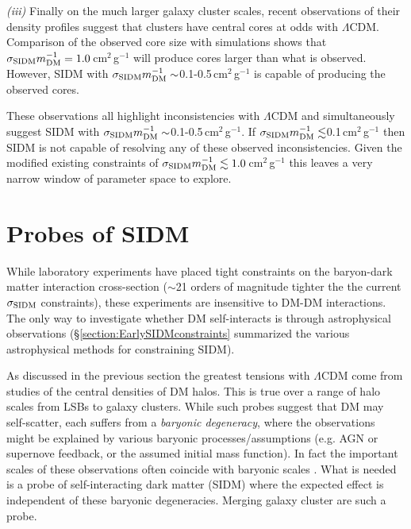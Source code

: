 {\it (iii)} Finally on the much larger galaxy cluster scales, recent observations of their density profiles \citep{Newman:2012wt, Newman:2012tk} suggest that clusters have central cores at odds with $\Lambda$CDM.
Comparison of the observed core size with simulations \citep{Peter:2012vi, Rocha:2012tr} shows that $\sigma_{\rm SIDM}m_{\rm DM}^{-1} = 1.0$\,cm$^2$\,g$^{-1}$ will produce cores larger than what is observed.
However, SIDM with $\sigma_{\rm SIDM}m_{\rm DM}^{-1} \sim$0.1-0.5\,cm$^2$\,g$^{-1}$ is capable of producing the observed cores.

These observations all highlight inconsistencies with $\Lambda$CDM and simultaneously suggest SIDM with $\sigma_{\rm SIDM}m_{\rm DM}^{-1}  \sim$0.1-0.5\,cm$^2$\,g$^{-1}$.
If $\sigma_{\rm SIDM}m_{\rm DM}^{-1}  \lesssim$0.1\,cm$^2$\,g$^{-1}$ then SIDM is not capable of resolving any of these observed inconsistencies.
Given the modified existing constraints of $\sigma_{\rm SIDM}m_{\rm DM}^{-1}\lesssim 1.0$\,cm$^2$\,g$^{-1}$ this leaves a very narrow window of parameter space to explore.

\section{Probes of SIDM}\label{section:SIDMprobes}

While laboratory experiments have placed tight constraints on the baryon-dark matter interaction cross-section ($\sim$21 orders of magnitude tighter the the current $\sigma_{\rm SIDM}$ constraints), these experiments are insensitive to DM-DM interactions.
The only way to investigate whether DM self-interacts is through astrophysical observations (\S\ref{section:EarlySIDMconstraints} summarized the various astrophysical methods for constraining SIDM). 

As discussed in the previous section the greatest tensions with $\Lambda$CDM come from studies of the central densities of DM halos.
This is true over a range of halo scales from LSBs to galaxy clusters.
While such probes suggest that DM may self-scatter, each suffers from a \emph{baryonic degeneracy}, where the observations might be explained by various baryonic processes/assumptions (e.g. AGN or supernove feedback, or the assumed initial mass function).
In fact the important scales of these observations often coincide with baryonic scales \citep[e.g. the core size in clusters is approximately the size of the brightest cluster galaxy;][]{Newman:2012wt, Newman:2012tk}.
What is needed is a probe of self-interacting dark matter (SIDM) where the expected effect is independent of these baryonic degeneracies.
Merging galaxy cluster are such a probe. 

